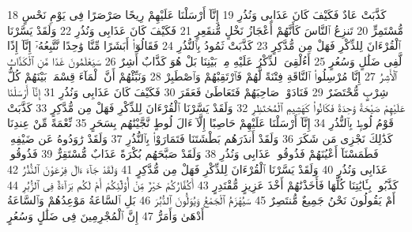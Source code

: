 {\tiny\colorbox{cl_aya}{18}} كَذَّبَتْ عَادٌ فَكَيْفَ كَانَ عَذَابِى وَنُذُرِ
{\tiny\colorbox{cl_aya}{19}} إِنَّآ أَرْسَلْنَا عَلَيْهِمْ رِيحًا صَرْصَرًا فِى يَوْمِ نَحْسٍ مُّسْتَمِرٍّ
{\tiny\colorbox{cl_aya}{20}} تَنزِعُ ٱلنَّاسَ كَأَنَّهُمْ أَعْجَازُ نَخْلٍ مُّنقَعِرٍ
{\tiny\colorbox{cl_aya}{21}} فَكَيْفَ كَانَ عَذَابِى وَنُذُرِ
{\tiny\colorbox{cl_aya}{22}} وَلَقَدْ يَسَّرْنَا ٱلْقُرْءَانَ لِلذِّكْرِ فَهَلْ مِن مُّدَّكِرٍ
{\tiny\colorbox{cl_aya}{23}} كَذَّبَتْ ثَمُودُ بِٱلنُّذُرِ
{\tiny\colorbox{cl_aya}{24}} فَقَالُوٓا۟ أَبَشَرًا مِّنَّا وَٰحِدًا نَّتَّبِعُهُۥٓ إِنَّآ إِذًا لَّفِى ضَلَٰلٍ وَسُعُرٍ
{\tiny\colorbox{cl_aya}{25}} أَءُلْقِىَ ٱلذِّكْرُ عَلَيْهِ مِنۢ بَيْنِنَا بَلْ هُوَ كَذَّابٌ أَشِرٌ
{\tiny\colorbox{cl_aya}{26}} سَيَعْلَمُونَ غَدًا مَّنِ ٱلْكَذَّابُ ٱلْأَشِرُ
{\tiny\colorbox{cl_aya}{27}} إِنَّا مُرْسِلُوا۟ ٱلنَّاقَةِ فِتْنَةً لَّهُمْ فَٱرْتَقِبْهُمْ وَٱصْطَبِرْ
{\tiny\colorbox{cl_aya}{28}} وَنَبِّئْهُمْ أَنَّ ٱلْمَآءَ قِسْمَةٌۢ بَيْنَهُمْ كُلُّ شِرْبٍ مُّحْتَضَرٌ
{\tiny\colorbox{cl_aya}{29}} فَنَادَوْا۟ صَاحِبَهُمْ فَتَعَاطَىٰ فَعَقَرَ
{\tiny\colorbox{cl_aya}{30}} فَكَيْفَ كَانَ عَذَابِى وَنُذُرِ
{\tiny\colorbox{cl_aya}{31}} إِنَّآ أَرْسَلْنَا عَلَيْهِمْ صَيْحَةً وَٰحِدَةً فَكَانُوا۟ كَهَشِيمِ ٱلْمُحْتَظِرِ
{\tiny\colorbox{cl_aya}{32}} وَلَقَدْ يَسَّرْنَا ٱلْقُرْءَانَ لِلذِّكْرِ فَهَلْ مِن مُّدَّكِرٍ
{\tiny\colorbox{cl_aya}{33}} كَذَّبَتْ قَوْمُ لُوطٍۭ بِٱلنُّذُرِ
{\tiny\colorbox{cl_aya}{34}} إِنَّآ أَرْسَلْنَا عَلَيْهِمْ حَاصِبًا إِلَّآ ءَالَ لُوطٍ نَّجَّيْنَٰهُم بِسَحَرٍ
{\tiny\colorbox{cl_aya}{35}} نِّعْمَةً مِّنْ عِندِنَا كَذَٰلِكَ نَجْزِى مَن شَكَرَ
{\tiny\colorbox{cl_aya}{36}} وَلَقَدْ أَنذَرَهُم بَطْشَتَنَا فَتَمَارَوْا۟ بِٱلنُّذُرِ
{\tiny\colorbox{cl_aya}{37}} وَلَقَدْ رَٰوَدُوهُ عَن ضَيْفِهِۦ فَطَمَسْنَآ أَعْيُنَهُمْ فَذُوقُوا۟ عَذَابِى وَنُذُرِ
{\tiny\colorbox{cl_aya}{38}} وَلَقَدْ صَبَّحَهُم بُكْرَةً عَذَابٌ مُّسْتَقِرٌّ
{\tiny\colorbox{cl_aya}{39}} فَذُوقُوا۟ عَذَابِى وَنُذُرِ
{\tiny\colorbox{cl_aya}{40}} وَلَقَدْ يَسَّرْنَا ٱلْقُرْءَانَ لِلذِّكْرِ فَهَلْ مِن مُّدَّكِرٍ
{\tiny\colorbox{cl_aya}{41}} وَلَقَدْ جَآءَ ءَالَ فِرْعَوْنَ ٱلنُّذُرُ
{\tiny\colorbox{cl_aya}{42}} كَذَّبُوا۟ بِـَٔايَٰتِنَا كُلِّهَا فَأَخَذْنَٰهُمْ أَخْذَ عَزِيزٍ مُّقْتَدِرٍ
{\tiny\colorbox{cl_aya}{43}} أَكُفَّارُكُمْ خَيْرٌ مِّنْ أُو۟لَٰٓئِكُمْ أَمْ لَكُم بَرَآءَةٌ فِى ٱلزُّبُرِ
{\tiny\colorbox{cl_aya}{44}} أَمْ يَقُولُونَ نَحْنُ جَمِيعٌ مُّنتَصِرٌ
{\tiny\colorbox{cl_aya}{45}} سَيُهْزَمُ ٱلْجَمْعُ وَيُوَلُّونَ ٱلدُّبُرَ
{\tiny\colorbox{cl_aya}{46}} بَلِ ٱلسَّاعَةُ مَوْعِدُهُمْ وَٱلسَّاعَةُ أَدْهَىٰ وَأَمَرُّ
{\tiny\colorbox{cl_aya}{47}} إِنَّ ٱلْمُجْرِمِينَ فِى ضَلَٰلٍ وَسُعُرٍ
